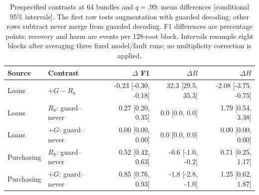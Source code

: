 \begin{table}[t]
\centering\footnotesize
\setlength{\tabcolsep}{4pt}
\caption{Prespecified contrasts at 64 bundles and $q=.99$: mean differences [conditional 95\% intervals]. The first row tests augmentation with guarded decoding; other rows subtract never merge from guarded decoding. F1 differences are percentage points; recovery and harm are events per 128-root block. Intervals resample eight blocks after averaging three fixed model/fault runs; no multiplicity correction is applied.}
\label{tab:fresh-contrasts}
\begin{tabular}{ll rrr}
\toprule
Source & Contrast & $\Delta$ F1 & $\Delta R$ & $\Delta H$ \\ \midrule
Loans & $+G-R_8$ & -0.23 [-0.30, -0.18] & 32.3 [29.5, 35.3] & -2.08 [-3.75, -0.75] \\
Loans & $R_8$: guard--never & 0.27 [0.20, 0.35] & 0.0 [0.0, 0.0] & 1.79 [0.54, 3.38] \\
Loans & $+G$: guard--never & 0.00 [0.00, 0.00] & 0.0 [0.0, 0.0] & 0.00 [0.00, 0.00] \\
Purchasing & $R_8$: guard--never & 0.52 [0.42, 0.63] & -0.6 [-1.0, -0.2] & 0.71 [0.25, 1.17] \\
Purchasing & $+G$: guard--never & 0.85 [0.76, 0.93] & -1.8 [-2.8, -1.0] & 1.25 [0.62, 1.87] \\
\bottomrule
\end{tabular}
\end{table}

